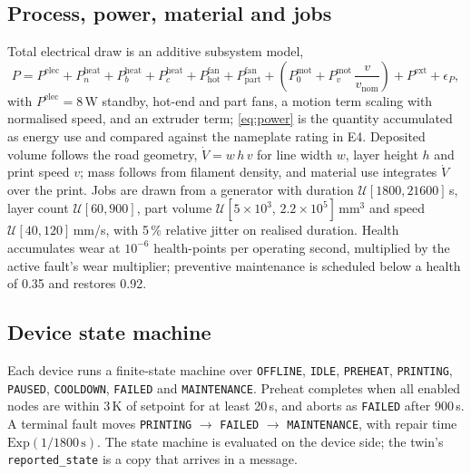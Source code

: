 \documentclass[preprint,12pt,authoryear,nopreprintline]{elsarticle}
\begin{document}
\subsection{Process, power, material and jobs}
\label{sec:process}
Total electrical draw is an additive subsystem model,
\begin{equation}
P = P^{\mathrm{elec}} + P^{\mathrm{heat}}_n + P^{\mathrm{heat}}_b
+ P^{\mathrm{heat}}_c + P^{\mathrm{fan}}_{\mathrm{hot}}
+ P^{\mathrm{fan}}_{\mathrm{part}}
+ \left(P^{\mathrm{mot}}_{0} + P^{\mathrm{mot}}_{v}\,\frac{v}{v_{\mathrm{nom}}}\right)
+ P^{\mathrm{ext}} + \epsilon_P ,
\label{eq:power}
\end{equation}
with $P^{\mathrm{elec}} = 8$\,W standby, hot-end and part fans, a motion term
scaling with normalised speed, and an extruder term; \eqref{eq:power} is the
quantity accumulated as energy use and compared against the nameplate rating in
E4.
Deposited volume follows the road geometry, $\dot{V} = w\,h\,v$ for line width
$w$, layer height $h$ and print speed $v$; mass follows from filament density,
and material use integrates $\dot{V}$ over the print.
Jobs are drawn from a generator with duration
$\mathcal{U}[1800,21600]$\,s, layer count $\mathcal{U}[60,900]$, part volume
$\mathcal{U}[5\times10^{3},\,2.2\times10^{5}]$\,mm$^{3}$ and speed
$\mathcal{U}[40,120]$\,mm/s, with 5\,\% relative jitter on realised duration.
Health accumulates wear at $10^{-6}$ health-points per operating second,
multiplied by the active fault's wear multiplier; preventive maintenance is
scheduled below a health of 0.35 and restores 0.92.

\subsection{Device state machine}
\label{sec:states}
Each device runs a finite-state machine over \texttt{OFFLINE}, \texttt{IDLE},
\texttt{PREHEAT}, \texttt{PRINTING}, \texttt{PAUSED}, \texttt{COOLDOWN},
\texttt{FAILED} and \texttt{MAINTENANCE}.
Preheat completes when all enabled nodes are within 3\,K of setpoint for at least
20\,s, and aborts as \texttt{FAILED} after 900\,s.
A terminal fault moves \texttt{PRINTING} $\to$ \texttt{FAILED} $\to$
\texttt{MAINTENANCE}, with repair time $\mathrm{Exp}(1/1800\,\mathrm{s})$.
The state machine is evaluated on the device side; the twin's
\texttt{reported\_state} is a copy that arrives in a message.
\end{document}
